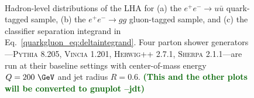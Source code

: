 \documentclass[11pt]{cernrep}
\newcommand{\jdt}[1]{\textbf{\textcolor{darkgreen}{(#1 --jdt)}}}
\begin{document}
\begin{figure}
\centering
{}
$\qquad$

\caption{Hadron-level distributions of the LHA for (a) the $e^+ e^- \to u \bar{u}$ quark-tagged sample, (b) the $e^+ e^- \to gg$ gluon-tagged sample, and (c) the classifier separation integrand in Eq.~\eqref{quarkgluon_eq:deltaintegrand}.  Four parton shower generators---\textsc{Pythia 8.205}, \textsc{Vincia 1.201}, \textsc{Herwig++ 2.7.1}, \textsc{Sherpa 2.1.1}---are run at their baseline settings with center-of-mass energy $Q = 200~\GeV$ and jet radius $R= 0.6$.  \jdt{This and the other plots will be converted to gnuplot}}
\label{quarkgluon_fig:LHA_hadron}
\end{figure}
\end{document}
